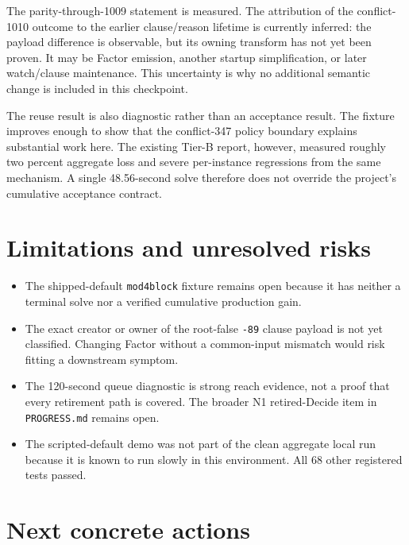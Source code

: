 \documentclass[11pt]{article}
\newcommand{\code}[1]{\nolinkurl{#1}}
\newcommand{\measured}{\textcolor{blue!55!black}{measured}}
\newcommand{\inferred}{\textcolor{orange!65!black}{inferred}}
\begin{document}
The parity-through-1009 statement is \measured{}.  The attribution of the
conflict-1010 outcome to the earlier clause/reason lifetime is currently
\inferred{}: the payload difference is observable, but its owning transform
has not yet been proven.  It may be Factor emission, another startup
simplification, or later watch/clause maintenance.  This uncertainty is why no
additional semantic change is included in this checkpoint.

The reuse result is also diagnostic rather than an acceptance result.  The
fixture improves enough to show that the conflict-347 policy boundary explains
substantial work here.  The existing Tier-B report, however, measured roughly
two percent aggregate loss and severe per-instance regressions from the same
mechanism.  A single 48.56-second solve therefore does not override the
project's cumulative acceptance contract.

\section{Limitations and unresolved risks}

\begin{itemize}[leftmargin=*,itemsep=3pt]
  \item The shipped-default \code{mod4block} fixture remains open because it
  has neither a terminal solve nor a verified cumulative production gain.
  \item The exact creator or owner of the root-false \code{-89} clause payload
  is not yet classified.  Changing Factor without a common-input mismatch
  would risk fitting a downstream symptom.
  \item The 120-second queue diagnostic is strong reach evidence, not a proof
  that every retirement path is covered.  The broader N1 retired-Decide item
  in \code{PROGRESS.md} remains open.
  \item The scripted-default demo was not part of the clean aggregate local
  run because it is known to run slowly in this environment.  All 68 other
  registered tests passed.
\end{itemize}

\section{Next concrete actions}
\end{document}
